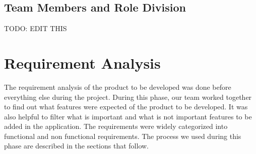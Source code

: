 \documentclass[12pt, a4paper, oneside]{article}
\begin{document}
\subsection{Team Members and Role Division}
TODO: EDIT THIS
%



\pagebreak
\section{Requirement Analysis}
The requirement analysis of the product to be developed was done before everything else during the project. During this phase, our team worked together to find out what features were expected of the product to be developed. It was also helpful to filter what is important and what is not important features to be added in the application. The requirements were widely categorized into functional and non functional requirements. The process we used during this phase are described in the sections that follow.

% 

\end{document}

